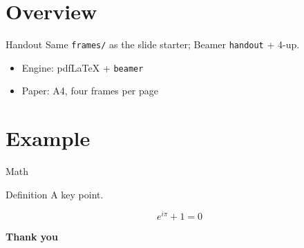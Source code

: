 \section{Overview}

\begin{frame}{Handout}
  Same \texttt{frames/} as the slide starter; Beamer \texttt{handout} + 4-up.
  \begin{itemize}
    \item Engine: pdfLaTeX + \texttt{beamer}
    \item Paper: A4, four frames per page
  \end{itemize}
\end{frame}

\section{Example}

\begin{frame}{Math}
  \begin{block}{Definition}
    A key point.
  \end{block}
  \[ e^{i\pi}+1=0 \]
\end{frame}

\begin{frame}[plain]
  \vfill\centering
  {\Large\bfseries\color{chaptercolor} Thank you\par}
  \vfill
\end{frame}
